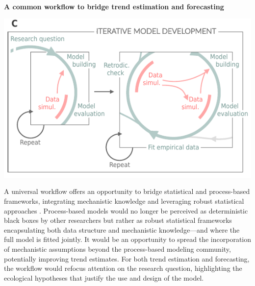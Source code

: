 \documentclass[11pt]{article}
\begin{document}
\begin{tcolorbox}
{\begin{multicols}{2}
\vfill

\end{multicols}}

\centerline{\bf A common workflow to bridge trend estimation and forecasting} %
\vspace*{-3mm}
{\begin{multicols}{2}
\begin{minipage}[t]{\linewidth}
	\vfill
\includegraphics[width=\linewidth]{../figures/iterativeworkflow_details}
\vfill
\vspace*{3mm}
\end{minipage}

\columnbreak
\vspace*{1mm}
A universal workflow offers an opportunity to bridge statistical and process-based frameworks, integrating mechanistic knowledge and leveraging robust statistical approaches \citep[e.g.][]{rounce2020quantifying}. Process-based models would no longer be perceived as deterministic black boxes by other researchers but rather as robust statistical frameworks encapsulating both data structure and mechanistic knowledge---and where the full model is fitted jointly. It would be an opportunity to spread the incorporation of mechanistic assumptions beyond the process-based modeling community, potentially improving trend estimates. For both trend estimation and forecasting, the workflow would refocus attention on the research question, highlighting the ecological hypotheses that justify the use and design of the model.

\end{multicols}}

\end{tcolorbox}
\end{document}
